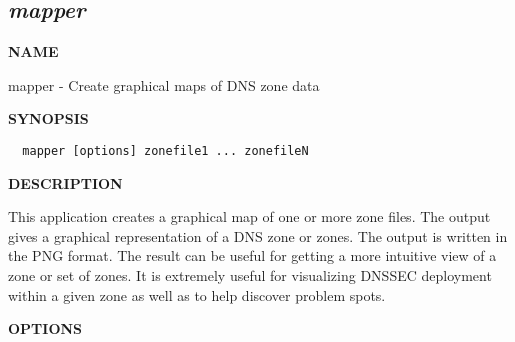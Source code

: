 \clearpage

\subsection{\it mapper}


{\bf NAME}

mapper - Create graphical maps of DNS zone data

{\bf SYNOPSIS}

\begin{verbatim}  mapper [options] zonefile1 ... zonefileN\end{verbatim}

{\bf DESCRIPTION}

This application creates a graphical map of one or more zone files.  The
output gives a graphical representation of a DNS zone or zones.  The output
is written in the PNG format.  The result can be useful for getting a more
intuitive view of a zone or set of zones.  It is extremely useful for
visualizing DNSSEC deployment within a given zone as well as to help discover
problem spots.

{\bf OPTIONS}

